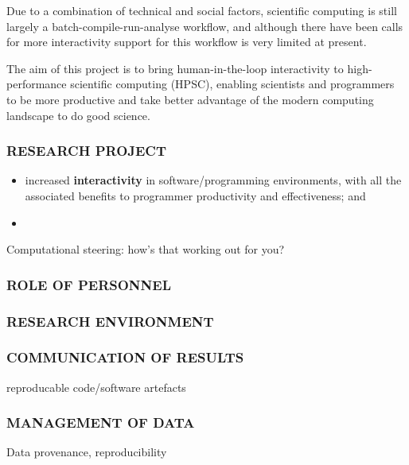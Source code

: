 \documentclass[a4paper]{scrartcl}
\begin{document}
Due to a combination of technical and social factors, scientific
computing is still largely a batch-compile-run-analyse workflow, and
although there have been calls for more
interactivity\parencite{Gil2007} support for this workflow is very
limited at present\parencite{Mattoso}.

The aim of this project is to bring human-in-the-loop interactivity to
high-performance scientific computing (HPSC), enabling scientists and
programmers to be more productive and take better advantage of the
modern computing landscape to do good science.

\subsubsection*{RESEARCH PROJECT}

\parencite{Mattoso}

\begin{itemize}
\item increased \textbf{interactivity} in software/programming
  environments, with all the associated benefits to programmer
  productivity and effectiveness; and
\item 
\end{itemize}

Computational steering: how's that working out for you?


\subsubsection*{ROLE OF PERSONNEL}



\subsubsection*{RESEARCH ENVIRONMENT}



\subsubsection*{COMMUNICATION OF RESULTS}

reproducable code/software artefacts

\subsubsection*{MANAGEMENT OF DATA}

Data provenance, reproducibility
\end{document}
